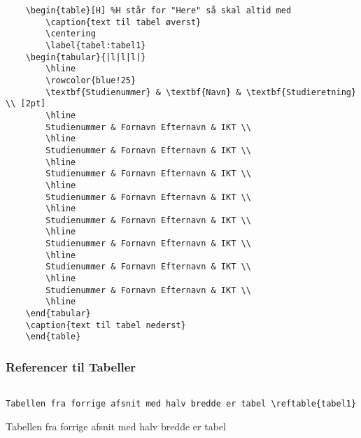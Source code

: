 \begin{verbatim}
    \begin{table}[H] %H står for "Here" så skal altid med
        \caption{text til tabel øverst}
        \centering
        \label{tabel:tabel1}
    \begin{tabular}{|l|l|l|}
        \hline
        \rowcolor{blue!25}
        \textbf{Studienummer} & \textbf{Navn} & \textbf{Studieretning} \\ [2pt]
        \hline
        Studienummer & Fornavn Efternavn & IKT \\
        \hline
        Studienummer & Fornavn Efternavn & IKT \\
        \hline
        Studienummer & Fornavn Efternavn & IKT \\
        \hline
        Studienummer & Fornavn Efternavn & IKT \\
        \hline
        Studienummer & Fornavn Efternavn & IKT \\
        \hline
        Studienummer & Fornavn Efternavn & IKT \\
        \hline
        Studienummer & Fornavn Efternavn & IKT \\
        \hline
        Studienummer & Fornavn Efternavn & IKT \\
        \hline
    \end{tabular}
    \caption{text til tabel nederst}
    \end{table}
\end{verbatim}

\subsubsection{Referencer til Tabeller}
\begin{verbatim}

Tabellen fra forrige afsnit med halv bredde er tabel \reftable{tabel1}
\end{verbatim}

Tabellen fra forrige afsnit med halv bredde er tabel 
